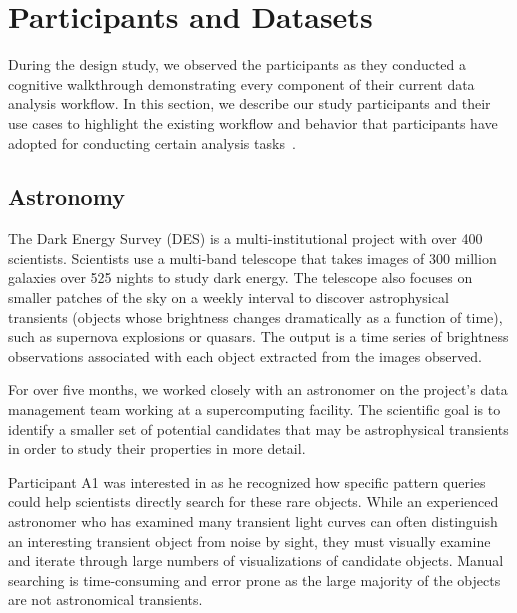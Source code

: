 \section{Participants and Datasets}
During the design study, we observed the participants as they conducted a cognitive walkthrough demonstrating every component of their current data analysis workflow. In this section, we describe our study participants and their use cases to highlight the existing workflow and behavior that participants have adopted for conducting certain analysis tasks~\cite{Nielsen1994}.
\subsection{Astronomy} 
\par The Dark Energy Survey (DES) is a multi-institutional project with over 400 scientists. Scientists use a multi-band telescope that takes images of 300 million galaxies over 525 nights to study dark energy\cite{Drlica-Wagner2017}. The telescope also focuses on smaller patches of the sky on a weekly interval to discover astrophysical transients (objects whose brightness changes dramatically as a function of time), such as supernova explosions or quasars. The output is a time series of brightness observations associated with each object extracted from the images observed.
\par For over five months, we worked closely with an astronomer on the project's data management team working at a supercomputing facility. The scientific goal is to identify a smaller set of potential candidates that may be astrophysical transients in order to study their properties in more detail. 
\par Participant A1 was interested in \zv as he recognized how specific pattern queries could help scientists directly search for these rare objects. While an experienced astronomer who has examined many transient light curves can often distinguish an interesting transient object from noise by sight, they must visually examine and iterate through large numbers of visualizations of candidate objects. Manual searching is time-consuming and error prone as the large majority of the objects are not astronomical transients.


